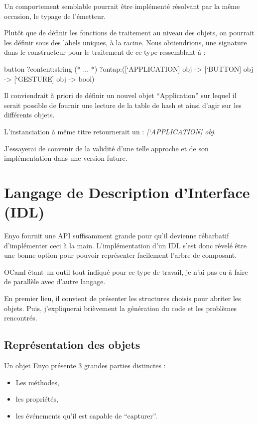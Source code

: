 \documentclass[11pt,a4paper]{report}
\begin{document}
Un comportement semblable pourrait être implémenté résolvant par la même occasion, le typage de l'émetteur.

Plutôt que de définir les fonctions de traitement au niveau des objets, on pourrait les définir
sous des labels uniques, à la racine. Nous obtiendrions, une signature dans le constructeur
pour le traitement de ce type ressemblant à :
\begin{OCaml}
  button ?content:string
         (* ... *)
         ?ontap:([`APPLICATION] obj -> 
                 [`BUTTON] obj -> 
                 [`GESTURE] obj -> bool)
\end{OCaml}

Il conviendrait à priori de définir un nouvel objet ``Application'' sur lequel il serait possible de
fournir une lecture de la table de hash et ainsi d'agir sur les différents objets.

L'instanciation à même titre retournerait un : \emph{[`APPLICATION] obj}.

J'essayerai de convenir de la validité d'une telle approche et de son implémentation dans une 
version future.


\chapter{Langage de Description d'Interface (IDL)}\label{chap:idl}

Enyo fournit une API suffisamment grande pour qu'il devienne rébarbatif d'implémenter
ceci à la main. L'implémentation d'un IDL s'est donc révelé être une bonne option pour pouvoir
représenter facilement l'arbre de composant.

OCaml étant un outil tout indiqué pour ce type de travail, je n'ai pas eu à faire de parallèle 
avec d'autre langage.

En premier lieu, il convient de présenter les structures choisis pour abriter les objets.
Puis, j'expliquerai brièvement la génération du code et les problèmes rencontrés.

\section{Représentation des objets}

Un objet Enyo présente 3 grandes parties distinctes :
\begin{itemize}
  \item Les méthodes,
  \item les propriétés,
  \item les événements qu'il est capable de ``capturer''.
\end{itemize}
\end{document}
